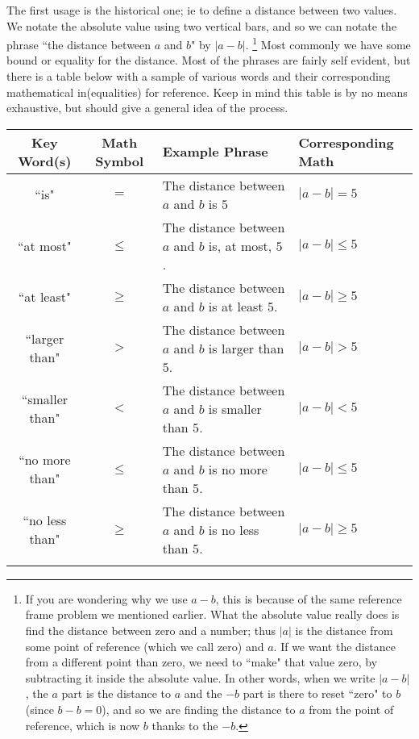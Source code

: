 \documentclass{ximera}
\begin{document}
    The first usage is the historical one; ie to define a distance between two values. We notate the absolute value using two vertical bars, and so we can notate the phrase ``the distance between $a$ and $b$" by $|a-b|$.%
    \footnote{If you are wondering why we use $a - b$, this is because of the same reference frame problem we mentioned earlier. What the absolute value really does is find the distance between zero and a number; thus $|a|$ is the distance from some point of reference (which we call zero) and $a$. If we want the distance from a different point than zero, we need to ``make" that value zero, by subtracting it inside the absolute value. In other words, when we write $|a - b|$, the $a$ part is the distance to $a$ and the $ - b$ part is there to reset ``zero" to $b$ (since $b - b = 0$), and so we are finding the distance to $a$ from the point of reference, which is now $b$ thanks to the $-b$.}
    Most commonly we have some bound or equality for the distance. Most of the phrases are fairly self evident, but there is a table below with a sample of various words and their corresponding mathematical in(equalities) for reference. Keep in mind this table is by no means exhaustive, but should give a general idea of the process.
    
    \begin{tabularx}{\textwidth}{|ccXX|}\hline
        Key Word(s)         &   Math Symbol &   Example Phrase                                      & Corresponding Math\\ \hline
        
        ``is"               &   $=$         &   The distance between $a$ and $b$ is $5$             & $|a-b| = 5$\\\hdashline
        ``at most"          &   $\leq$      &   The distance between $a$ and $b$ is, at most, $5$.  & $|a-b| \leq 5$\\\hdashline
        ``at least"         &   $\geq$      &   The distance between $a$ and $b$ is at least $5$.   & $|a-b| \geq 5$\\\hdashline
        ``larger than"   &   $>$            &   The distance between $a$ and $b$ is larger than $5$.& $|a-b| > 5$\\\hdashline
        ``smaller than"  &   $<$            &   The distance between $a$ and $b$ is smaller than $5$.& $|a-b| < 5$\\ 
        ``no more than"  &   $\leq$         &   The distance between $a$ and $b$ is no more than $5$.& $|a-b| \leq 5$\\\hdashline
        ``no less than"  &   $\geq$         &   The distance between $a$ and $b$ is no less than $5$.& $|a-b| \geq 5$\\\hdashline
        \hline
    \end{tabularx}
\end{document}
